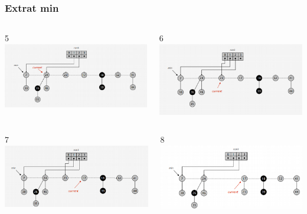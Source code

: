 \documentclass{beamer}
\begin{document}
\begin{frame}
 \frametitle{Extrat min}
 \begin{columns}[t]
 5
    \includegraphics[width =0.9 \textwidth]{imagenes/delete5.png}
      
    6
    \includegraphics[width =0.9 \textwidth]{imagenes/delete6.png}

   \end{columns}
   \begin{columns}[t]
   7
    \includegraphics[width =0.9 \textwidth]{imagenes/delete7.png}
      
    8
    \includegraphics[width =0.9 \textwidth]{imagenes/delete8.png}

   \end{columns}
   \end{frame}
   
\end{document}
